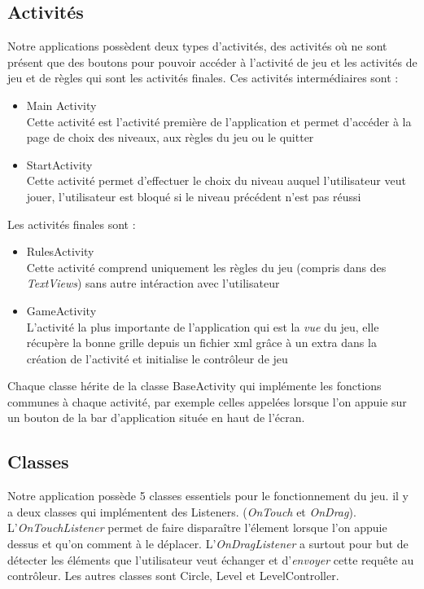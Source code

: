 \subsection{Activités}
Notre applications possèdent deux types d'activités, des activités où ne sont présent que des boutons pour pouvoir accéder à l'activité de jeu et les activités de jeu et de règles qui sont les activités finales. Ces activités intermédiaires sont :
\begin{itemize}
\item Main Activity \\
Cette activité est l'activité première de l'application et permet d'accéder à la page de choix des niveaux,  aux règles du jeu ou  le quitter
\item StartActivity \\
Cette activité permet d'effectuer le choix du niveau auquel l'utilisateur veut jouer, l'utilisateur est bloqué si le niveau précédent n'est pas réussi
\end{itemize}
Les activités finales sont : \\
\begin{itemize}
\item RulesActivity \\
Cette activité comprend uniquement les règles du jeu (compris dans des \textit{TextViews}) sans autre intéraction avec l'utilisateur
\item GameActivity \\
L'activité la plus importante de l'application qui est la \textit{vue} du jeu, elle récupère la bonne  grille depuis un fichier xml grâce à un extra dans la création de l'activité et initialise le contrôleur de jeu
\end{itemize}
Chaque classe hérite de la classe BaseActivity qui implémente les fonctions communes à chaque activité, par exemple celles appelées lorsque l'on appuie sur un bouton de la bar d'application située en haut de l'écran.


\subsection{Classes}
Notre application possède 5 classes essentiels pour le fonctionnement du jeu. il y a deux classes qui implémentent des Listeners. (\textit{OnTouch} et \textit{OnDrag}). L'\textit{OnTouchListener} permet de faire disparaître l'élement lorsque l'on appuie dessus et qu'on comment à le déplacer.   L'\textit{OnDragListener} a surtout pour but de détecter les éléments que l'utilisateur veut échanger et d'\textit{envoyer} cette requête au contrôleur. Les autres classes sont Circle, Level et LevelController.
